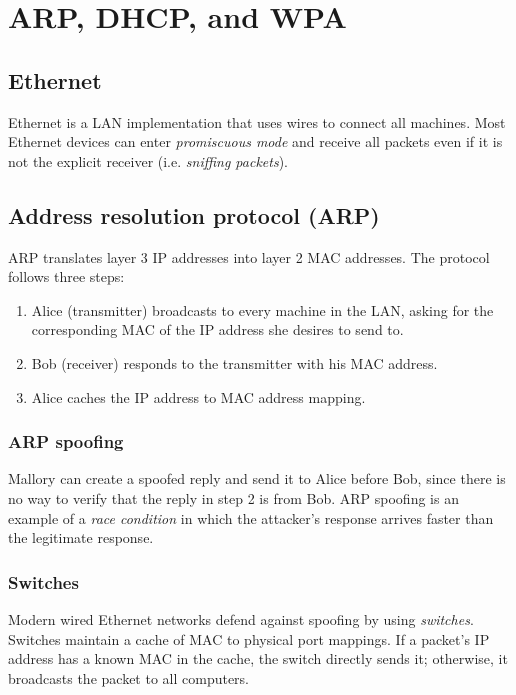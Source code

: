 \chapter{ARP, DHCP, and WPA}

\section{Ethernet}
Ethernet is a LAN implementation that uses wires to connect all machines. Most Ethernet devices can enter \emph{promiscuous mode} and receive all packets even if it is not the explicit receiver (i.e. \emph{sniffing packets}).

\section{Address resolution protocol (ARP)}
ARP translates layer 3 IP addresses into layer 2 MAC addresses. The protocol follows three steps:
\begin{enumerate}
    \item Alice (transmitter) broadcasts to every machine in the LAN, asking for the corresponding MAC of the IP address she desires to send to.
    \item Bob (receiver) responds to the transmitter with his MAC address.
    \item Alice caches the IP address to MAC address mapping.
\end{enumerate}

\subsection{ARP spoofing}
Mallory can create a spoofed reply and send it to Alice before Bob, since there is no way to verify that the reply in step 2 is from Bob. ARP spoofing is an example of a \emph{race condition} in which the attacker's response arrives faster than the legitimate response.

\subsection{Switches}
Modern wired Ethernet networks defend against spoofing by using \emph{switches}. Switches maintain a cache of MAC to physical port mappings. If a packet's IP address has a known MAC in the cache, the switch directly sends it; otherwise, it broadcasts the packet to all computers.

